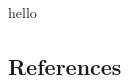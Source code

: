 \documentclass[authoryear]{elsarticle}
\begin{document}



% 





hello

\pagebreak
\subsection*{References}


\end{document}
